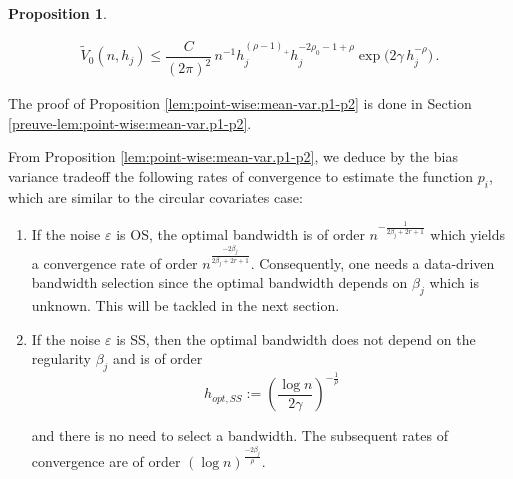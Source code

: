 \documentclass[11pt,a4paper,openany]{article}
\newtheorem{proposition}[thm]{Proposition}
\newtheorem{remark}[thm]{Remark}
\begin{document}
\begin{proposition}
\begin{enumerate}
\begin{align*}
	\widetilde V_{0}(n,h_{j})  \leq  %
	\dfrac{    C}{ (2\pi)^{2} }   \,   n^{-1} h_{j}^{(\rho - 1 )_{+} }     h_{j}^{-2\rho_{0} - 1 + \rho}  \exp \big( 2 \gamma   \,    h_{j}^{- \rho}  \big) 
	\,  .    
	\end{align*}
	\end{enumerate}
\end{proposition}


The proof of Proposition \ref{lem:point-wise:mean-var.p1-p2} is done in Section \ref{preuve-lem:point-wise:mean-var.p1-p2}.
\medskip

From Proposition \ref{lem:point-wise:mean-var.p1-p2}, we deduce by the bias variance tradeoff the following rates of convergence to estimate the function $p_i$, which are similar to the circular covariates case: 
\begin{enumerate}
\item  If the noise ${\varepsilon}$ is OS, the optimal bandwidth is of order ${n}^{-\frac{1}{2 \beta_j + 2 r +1 }}$ which yields a convergence rate of order $n^{\frac{-2 \beta_j}{2 \beta_j + 2 r +1 }}$. Consequently, one needs a data-driven bandwidth selection since the optimal bandwidth depends on $\beta_j$ which is unknown. This will be tackled in the next section.  
\item  If the noise  ${\varepsilon}$ is SS, then the optimal bandwidth does not depend on the regularity $\beta_j$ and is of order  
\begin{equation}\label{rate-pi-linear}
h_{opt, SS} := \left (\frac{\log n }{2 \gamma} \right )^{-\frac 1 \rho} 
\end{equation}

and there is no need to select a bandwidth. The subsequent rates of convergence are of order $ (\log n )^{\frac{-2 \beta_j}{\rho}}$. 
\end{enumerate}
\end{document}
